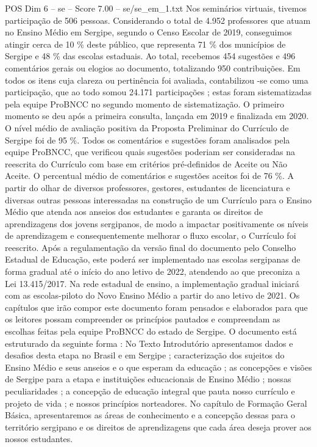 \begin{textsample}{POS Dim 6 – se – Score 7.00 – se/se\_em\_1.txt}
Nos seminários virtuais, tivemos participação de 506 pessoas.
Considerando o total de 4.952 professores que atuam no Ensino Médio em Sergipe, segundo o Censo Escolar de 2019, conseguimos atingir cerca de 10 \% deste público, que representa 71 \% dos municípios de Sergipe e 48 \% das escolas estaduais.
Ao total, recebemos 454 sugestões e 496 comentários gerais ou elogios ao documento, totalizando 950 contribuições.
Em todos os itens cuja clareza ou pertinência foi avaliada, contabilizou -se como uma participação, que ao todo somou 24.171 participações ; estas foram sistematizadas pela equipe ProBNCC no segundo momento de sistematização.
O primeiro momento se deu após a primeira consulta, lançada em 2019 e finalizada em 2020.
O nível médio de avaliação positiva da Proposta Preliminar do Currículo de Sergipe foi de 95 \%.
Todos os comentários e sugestões foram analisados pela equipe ProBNCC, que verificou quais sugestões poderiam ser consideradas na reescrita do Currículo com base em critérios pré-definidos de Aceite ou Não Aceite.
O percentual médio de comentários e sugestões aceitos foi de 76 \%.
A partir do olhar de diversos professores, gestores, estudantes de licenciatura e diversas outras pessoas interessadas na construção de um Currículo para o Ensino Médio que atenda aos anseios dos estudantes e garanta os direitos de aprendizagens dos jovens sergipanos, de modo a impactar positivamente os níveis de aprendizagem e consequentemente melhorar o fluxo escolar, o Currículo foi reescrito.
Após a regulamentação da versão final do documento pelo Conselho Estadual de Educação, este poderá ser implementado nas escolas sergipanas de forma gradual até o início do ano letivo de 2022, atendendo ao que preconiza a Lei 13.415/2017.
Na rede estadual de ensino, a implementação gradual iniciará com as escolas-piloto do Novo Ensino Médio a partir do ano letivo de 2021.
Os capítulos que irão compor este documento foram pensados e elaborados para que os leitores possam compreender os princípios pautados e compreendam as escolhas feitas pela equipe ProBNCC do estado de Sergipe.
O documento está estruturado da seguinte forma : No Texto Introdutório apresentamos dados e desafios desta etapa no Brasil e em Sergipe ; caracterização dos sujeitos do Ensino Médio e seus anseios e o que esperam da educação ; as concepções e visões de Sergipe para a etapa e instituições educacionais de Ensino Médio ; nossas peculiaridades ; a concepção de educação integral que pauta nosso currículo e projeto de vida ; e nossos princípios norteadores.
No capítulo de Formação Geral Básica, apresentaremos as áreas de conhecimento e a concepção dessas para o território sergipano e os direitos de aprendizagens que cada área deseja prover aos nossos estudantes.

\end{textsample}
